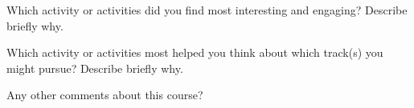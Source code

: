 \documentclass[handout,nooutcomes,space]{ximera}
\begin{document}
\begin{question}
Which activity or activities did you find most interesting and engaging?  Describe briefly why.  
\begin{freeResponse}
\end{freeResponse}
\end{question}


\begin{question}
Which activity or activities most helped you think about which track(s) you might pursue?  Describe briefly why.  
\begin{freeResponse}
\end{freeResponse}
\end{question}

\begin{question}
Any other comments about this course?  
\begin{freeResponse}
\end{freeResponse}
\end{question}
\end{document}

